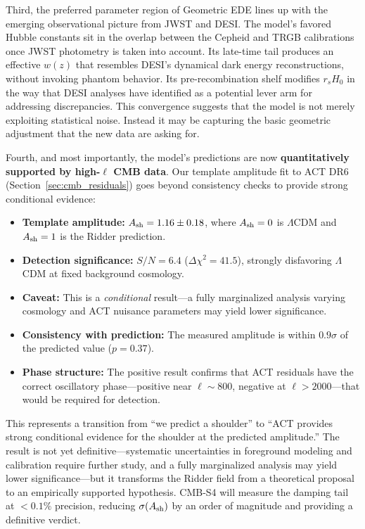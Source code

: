 \documentclass[a4paper,11pt]{article}
\begin{document}
Third, the preferred parameter region of Geometric EDE lines up with the emerging observational picture from JWST and DESI. The model's favored Hubble constants sit in the overlap between the Cepheid and TRGB calibrations once JWST photometry is taken into account. Its late-time tail produces an effective $w(z)$ that resembles DESI's dynamical dark energy reconstructions, without invoking phantom behavior. Its pre-recombination shelf modifies $r_s H_0$ in the way that DESI analyses have identified as a potential lever arm for addressing discrepancies. This convergence suggests that the model is not merely exploiting statistical noise. Instead it may be capturing the basic geometric adjustment that the new data are asking for.

Fourth, and most importantly, the model's predictions are now \textbf{quantitatively supported by high-$\ell$ CMB data}. Our template amplitude fit to ACT DR6 (Section~\ref{sec:cmb_residuals}) goes beyond consistency checks to provide strong conditional evidence:
\begin{itemize}
    \item \textbf{Template amplitude:} $A_{\rm sh} = 1.16 \pm 0.18$, where $A_{\rm sh} = 0$ is $\Lambda$CDM and $A_{\rm sh} = 1$ is the Ridder prediction.
    \item \textbf{Detection significance:} $S/N = 6.4$ ($\Delta\chi^2 = 41.5$), strongly disfavoring $\Lambda$CDM at fixed background cosmology.
    \item \textbf{Caveat:} This is a \emph{conditional} result---a fully marginalized analysis varying cosmology and ACT nuisance parameters may yield lower significance.
    \item \textbf{Consistency with prediction:} The measured amplitude is within $0.9\sigma$ of the predicted value ($p = 0.37$).
    \item \textbf{Phase structure:} The positive result confirms that ACT residuals have the correct oscillatory phase---positive near $\ell \sim 800$, negative at $\ell > 2000$---that would be required for detection.
\end{itemize}
This represents a transition from ``we predict a shoulder'' to ``ACT provides strong conditional evidence for the shoulder at the predicted amplitude.'' The result is not yet definitive---systematic uncertainties in foreground modeling and calibration require further study, and a fully marginalized analysis may yield lower significance---but it transforms the Ridder field from a theoretical proposal to an empirically supported hypothesis. CMB-S4 will measure the damping tail at $<0.1\%$ precision, reducing $\sigma(A_{\rm sh})$ by an order of magnitude and providing a definitive verdict.
\end{document}
